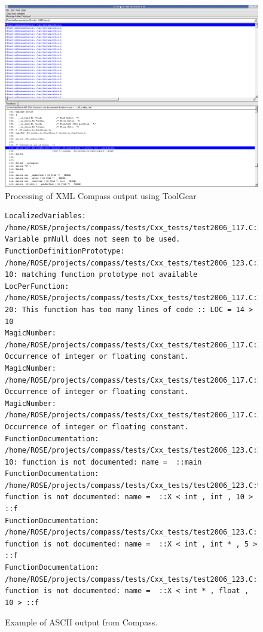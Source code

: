 \begin{figure}
\hspace{-0.7in}
\includegraphics[width=7in]{ToolGear_gui_compass_01.pdf}
\caption{Processing of XML Compass output using ToolGear}
\label{Compass_ToolGear_Screenshot}
\end{figure}

\begin{figure}
{\scriptsize
\begin{verbatim}
LocalizedVariables: /home/ROSE/projects/compass/tests/Cxx_tests/test2006_117.C:30.5: Variable pmNull does not seem to be used.
FunctionDefinitionPrototype: /home/ROSE/projects/compass/tests/Cxx_tests/test2006_123.C:27.1-10: matching function prototype not available
LocPerFunction: /home/ROSE/projects/compass/tests/Cxx_tests/test2006_117.C:23.1-20: This function has too many lines of code :: LOC = 14 > 10
MagicNumber: /home/ROSE/projects/compass/tests/Cxx_tests/test2006_117.C:33.14: Occurrence of integer or floating constant.
MagicNumber: /home/ROSE/projects/compass/tests/Cxx_tests/test2006_117.C:36.14: Occurrence of integer or floating constant.
MagicNumber: /home/ROSE/projects/compass/tests/Cxx_tests/test2006_117.C:37.14: Occurrence of integer or floating constant.
FunctionDocumentation: /home/ROSE/projects/compass/tests/Cxx_tests/test2006_123.C:27.1-10: function is not documented: name =  ::main
FunctionDocumentation: /home/ROSE/projects/compass/tests/Cxx_tests/test2006_123.C:9.10: function is not documented: name =  ::X < int , int , 10 > ::f
FunctionDocumentation: /home/ROSE/projects/compass/tests/Cxx_tests/test2006_123.C:12.10: function is not documented: name =  ::X < int , int * , 5 > ::f
FunctionDocumentation: /home/ROSE/projects/compass/tests/Cxx_tests/test2006_123.C:16.10: function is not documented: name =  ::X < int * , float , 10 > ::f
\end{verbatim}
}
\caption{Example of ASCII output from Compass. }
\label{Compass_ASCII_Output}
\end{figure}



